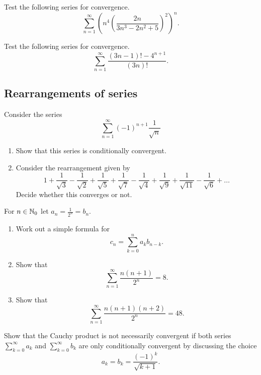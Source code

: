 \documentclass[10pt, a4paper]{article}
\newcommand{\infsum}[1][n = 1]{\sum_{#1}^{\infty}}
\begin{document}
\begin{example}
    Test the following series for convergence.
    \[
    \infsum \left(n ^ 4\left(\frac{2n}{3n ^ 3 - 2n ^ 2 + 5}\right) ^ 2\right) ^ n.
    \]
\end{example}

\begin{example}
    Test the following series for convergence.
    \[
    \infsum \frac{(3n - 1)! - 4 ^ {n + 1}}{(3n)!}.
    \]
\end{example}

\subsection{Rearrangements of series}

\begin{example}
    Consider the series
    \[
    \infsum (-1)^{n + 1} \frac{1}{\sqrt{n}}
    \]
    \begin{enumerate}[label = \alph*.]
        \item Show that this series is conditionally convergent.
        \item Consider the rearrangement given by
        \[
        1 + \frac{1}{\sqrt{3}} - \frac{1}{\sqrt{2}} + \frac{1}{\sqrt{5}} + \frac{1}{\sqrt{7}} - \frac{1}{\sqrt{4}} + \frac{1}{\sqrt{9}} + \frac{1}{\sqrt{11}} - \frac{1}{\sqrt{6}} + \dotsc
        \]
        Decide whether this converges or not.
    \end{enumerate}
\end{example}

\begin{example}
    For $n \in \mathbb{N}_0$ let $a_n = \frac{1}{2 ^ n} = b_n$.
    \begin{enumerate}[label = \alph*.]
        \item Work out a simple formula for
        \[
        c_n = \sum_{k = 0}^n a_k b_{n - k}.
        \]
        \item Show that
        \[
        \infsum \frac{n(n + 1)}{2 ^ n} = 8.
        \]
        \item Show that
        \[
        \infsum \frac{n(n + 1)(n + 2)}{2 ^ n} = 48.
        \]
    \end{enumerate}
\end{example}

\begin{example}
    Show that the Cauchy product is not necessarily convergent if both series $\infsum[k = 0] a_k$ and $\infsum[k = 0] b_k$ are only conditionally convergent by discussing the choice
    \[
    a_k = b_k = \frac{(-1) ^ k}{\sqrt{k + 1}}.
    \]
\end{example}
\end{document}

